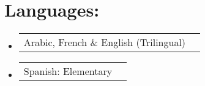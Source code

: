 \documentclass[letterpaper,11pt]{article}
\makeatletter
\newcommand{\resumePoint}[2]{
  \item
    \begin{tabular*}{0.97\textwidth}[t]{l@{\extracolsep{\fill}}r}
      #1 & \textbf{\small #2}
    \end{tabular*}
}
\newcommand{\resumeSubHeadingListStart}{\begin{itemize}[leftmargin=*]}
\newcommand{\resumeSubHeadingListEnd}{\end{itemize}}
\makeatother
\begin{document}

 \section{Languages:}
  \resumeSubHeadingListStart
    \resumePoint
     {Arabic, French \& English (Trilingual)}{}
   \vspace*{-0.7cm}
    \resumePoint
     {Spanish: Elementary}{}
  \resumeSubHeadingListEnd


\end{document}
